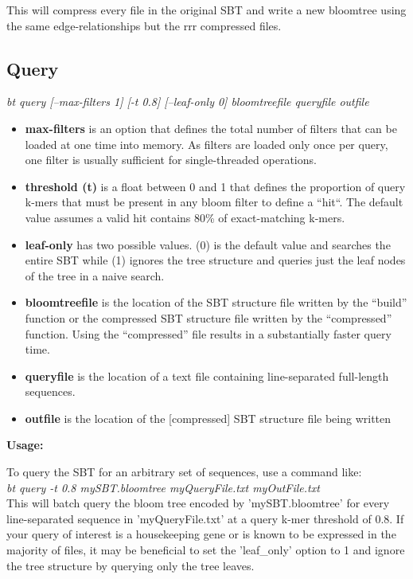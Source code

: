 \documentclass{article}
\begin{document}
This will compress every file in the original SBT and write a new bloomtree using the same edge-relationships but the rrr compressed files.


\subsection{Query}
\textit{bt query [--max-filters 1] [-t 0.8] [--leaf-only 0] bloomtreefile queryfile outfile}
\begin{itemize}
\item \textbf{max-filters} is an option that defines the total number of filters that can be loaded at one time into memory. As filters are loaded only once per query, one filter is usually sufficient for single-threaded operations.
\item \textbf{threshold (t)} is a float between 0 and 1 that defines the proportion of query k-mers that must be present in any bloom filter to define a ``hit``. The default value assumes a valid hit contains 80\% of exact-matching k-mers.
\item \textbf{leaf-only} has two possible values. (0) is the default value and searches the entire SBT while (1) ignores the tree structure and queries just the leaf nodes of the tree in a naive search.
\item \textbf{bloomtreefile} is the location of the SBT structure file written by the ``build'' function or the compressed SBT structure file written by the ``compressed'' function. Using the ``compressed'' file results in a substantially faster query time.
\item \textbf{queryfile} is the location of a text file containing line-separated full-length sequences.
\item \textbf{outfile} is the location of the [compressed] SBT structure file being written
\end{itemize}
\textbf{Usage:}

To query the SBT for an arbitrary set of sequences, use a command like: \\

\textit{bt query -t 0.8 mySBT.bloomtree myQueryFile.txt myOutFile.txt} \\

This will batch query the bloom tree encoded by 'mySBT.bloomtree' for every line-separated sequence in 'myQueryFile.txt' at a query k-mer threshold of 0.8. If your query of interest is a housekeeping gene or is known to be expressed in the majority of files, it may be beneficial to set the 'leaf\_only' option to 1 and ignore the tree structure by querying only the tree leaves. 
\end{document}
